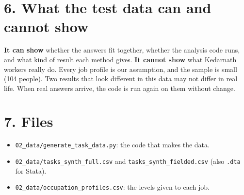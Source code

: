 \documentclass[11pt]{article}
\begin{document}
\section*{6. What the test data can and cannot show}
\textbf{It can show} whether the answers fit together, whether the analysis code runs, and what kind of result each method gives.
\textbf{It cannot show} what Kedarnath workers really do. Every job profile is our assumption, and the sample is small
(104 people). Two results that look different in this data may not differ in real life.
When real answers arrive, the code is run again on them without change.

\section*{7. Files}
\begin{itemize}[leftmargin=1.2em,itemsep=1pt]
\item \texttt{02\_data/generate\_task\_data.py}: the code that makes the data.
\item \texttt{02\_data/tasks\_synth\_full.csv} and \texttt{tasks\_synth\_fielded.csv} (also \texttt{.dta} for Stata).
\item \texttt{02\_data/occupation\_profiles.csv}: the levels given to each job.
\end{itemize}
\end{document}
